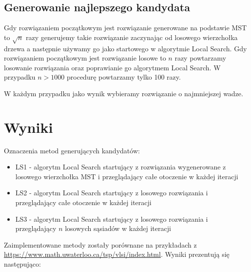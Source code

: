 \documentclass{article}
\begin{document}
\subsection{Generowanie najlepszego kandydata}
Gdy rozwiązaniem początkowym jest rozwiązanie generowane na podstawie MST to $\sqrt{n}$ razy 
generujemy takie rozwiązanie zaczynając od losowego wierzchołka drzewa a następnie 
używamy go jako startowego w algorytmie Local Search. \newline
Gdy rozwiązaniem początkowym jest rozwiązanie losowe to $n$ razy powtarzamy losowanie rozwiązania 
oraz poprawianie go algorytmem Local Search. W przypadku $n > 1000$ procedurę powtarzamy tylko 100 razy.

W każdym przypadku jako wynik wybieramy rozwiązanie o najmniejszej wadze.

\section{Wyniki}
Oznaczenia metod generujących kandydatów:
\begin{itemize}
    \item LS1 - algorytm Local Search startujący z rozwiązania wygenerowane z losowego wierzchołka MST i przeglądający całe otoczenie w każdej iteracji
    \item LS2 - algorytm Local Search startujący z losowego rozwiązania i przeglądający całe otoczenie w każdej iteracji
    \item LS3 - algorytm Local Search startujący z losowego rozwiązania i przeglądający $n$ losowych sąsiadów w każdej iteracji
\end{itemize}

Zaimplementowane metody zostały porównane na przykładach z 
\url{https://www.math.uwaterloo.ca/tsp/vlsi/index.html}. Wyniki prezentują się następująco:

\newpage
\end{document}
